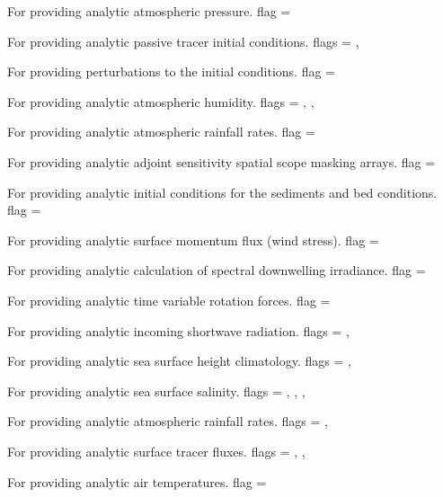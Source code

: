 \begin{klist}
For providing analytic atmospheric pressure.
 flag = 

For providing analytic passive tracer initial conditions.
 flags = , 

For providing perturbations to the initial conditions.
 flag = 

For providing analytic atmospheric humidity.
 flags = , ,

For providing analytic atmospheric rainfall rates.
 flag = 

For providing analytic adjoint sensitivity spatial scope masking
arrays.
 flag = 

For providing analytic initial conditions for the sediments and bed
conditions.
 flag = 

For providing analytic surface momentum flux (wind stress).
 flag = 

For providing analytic calculation of spectral downwelling
irradiance.
 flag = 

For providing analytic time variable rotation forces.
 flag = 

For providing analytic incoming shortwave radiation.
 flags = , 

For providing analytic sea surface height climatology.
 flags = ,

For providing analytic sea surface salinity.
 flags = , , ,

For providing analytic atmospheric rainfall rates.
 flags = ,

For providing analytic surface tracer fluxes.
 flags = , ,

For providing analytic air temperatures.
 flag = 


\end{klist}
